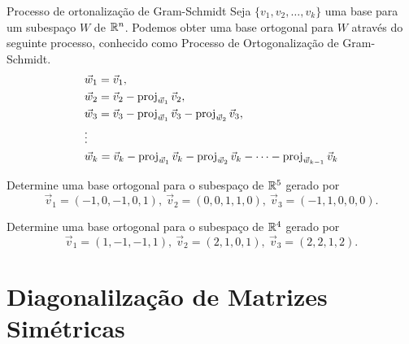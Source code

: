 \begin{frame}[label=orto]{Processo de ortonalização de Gram-Schmidt}
Seja $\{v_1,v_2,\ldots, v_k \}$ uma base para um subespaço $W$ de $\mathbb{R}^n$. 
Podemos obter uma base ortogonal para $W$ através do seguinte processo, conhecido como {\color{blue}Processo de Ortogonalização de Gram-Schmidt}.
\begin{align*}
& \vec{w}_1=\vec{v}_1,\\
& \vec{w}_2=\vec{v}_2-\operatorname{proj}_{{\vec{w}_1}}\vec{v}_2,\\
& \vec{w}_3=\vec{v}_3-\operatorname{proj}_{{\vec{w}_1}}\vec{v}_3
-\operatorname{proj}_{{\vec{w}_2}}\vec{v}_3,\\
& \vdots\\
& \vec{w}_k=\vec{v}_k-\operatorname{proj}_{{\vec{w}_1}}\vec{v}_k
-\operatorname{proj}_{{\vec{w}_2}}\vec{v}_k-\cdots-\operatorname{proj}_{{\vec{w}_{k-1}}}\vec{v}_k
\end{align*}


\begin{exe}
Determine uma base ortogonal para o subespaço de $\mathbb{R}^5$ gerado por
\[\vec{v}_1=(-1,0,-1,0,1),\ \vec{v}_2=(0,0,1,1,0),\ \vec{v}_3=(-1,1,0,0,0).\]
\end{exe}

\end{frame}




\begin{frame}[label=orto]{}

\begin{casa}
Determine uma base ortogonal para o subespaço de $\mathbb{R}^4$ gerado por
\[\vec{v}_1=(1,-1,-1,1),\ \vec{v}_2=(2,1,0,1),\ \vec{v}_3=(2,2,1,2).\]
\end{casa}
\end{frame}



\section{Diagonalilzação de Matrizes Simétricas}


